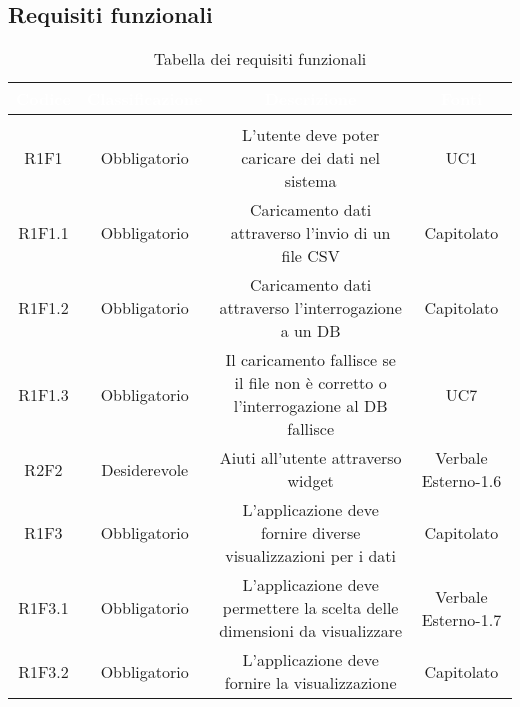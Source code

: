 \subsection{Requisiti funzionali}
\renewcommand{\arraystretch}{1.5}
\begin{center}
\begin{longtable}{C{\colA} C{\colB} C{\colC} C{\colA}}
		\textcolor{white}{\textbf{Codice}} & 
		\textcolor{white}{\textbf{Classificazione}} & 
		\textcolor{white}{\textbf{Descrizione}} & 
		\textcolor{white}{\textbf{Fonti}} \\
		\endfirsthead
	    \\
	    \endfoot
	    \caption{Tabella dei requisiti funzionali}
	    \endlastfoot

R1F1 & Obbligatorio & L'utente deve poter caricare dei dati nel sistema & UC1\\
R1F1.1 & Obbligatorio & Caricamento dati attraverso l'invio di un file CSV & Capitolato\\
R1F1.2 & Obbligatorio & Caricamento dati attraverso l'interrogazione a un DB & Capitolato\\
R1F1.3 & Obbligatorio & Il caricamento fallisce se il file non è corretto o l'interrogazione al DB fallisce & UC7\\
R2F2 & Desiderevole & Aiuti all'utente attraverso widget & Verbale Esterno-1.6 \\
R1F3 & Obbligatorio & L'applicazione deve fornire diverse visualizzazioni per i dati & Capitolato\\
R1F3.1 & Obbligatorio & L'applicazione deve permettere la scelta delle dimensioni da visualizzare & Verbale Esterno-1.7\\
R1F3.2 & Obbligatorio & L'applicazione deve fornire la visualizzazione  & Capitolato\\


\end{longtable}
\end{center}
